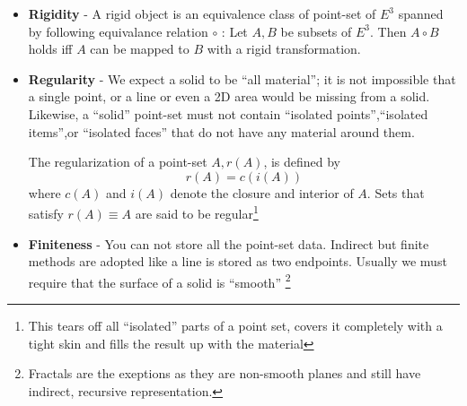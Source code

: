 \documentclass[12pt,a4paper,openbib]{article}
\begin{document}
\begin{itemize}
	\item {\bf Rigidity} -
		A rigid object is an equivalence class of point-set of $E^{3}$ spanned 			by following equivalance relation $\circ$ : Let $A,B$ be subsets of 
		$E^{3}$. Then $A \circ B$ holds iff $A$ can be mapped to $B$ with a 
		rigid transformation.
	\item {\bf Regularity} - We expect a solid to be ``all material''; it is 
		not impossible that a single point, or a line or even a 2D area would be
		missing from a solid. Likewise, a ``solid'' point-set must not contain
		``isolated points'',``isolated items'',or ``isolated faces'' that do not
		have any material around them.

		The regularization of a point-set $A,r(A)$, is defined by
		\begin{equation}
			r(A) = c(i(A))
		\end{equation}
		where $c(A)$ and $i(A)$ denote the closure and interior of $A$. Sets
		that satisfy $r(A) \equiv A$ are said to be regular\footnote{This 
		tears off all ``isolated'' parts of a point set, covers it completely 
		with a tight skin and fills the result up with the material}
	\item {\bf Finiteness} - You can not store all the point-set data. Indirect
		but finite methods are adopted like a line is stored as two endpoints.
		Usually we must require that the surface of a solid is ``smooth''
		\footnote{Fractals are the exeptions as they are non-smooth planes
and still have indirect, recursive representation.}
\end{itemize}
\end{document}
